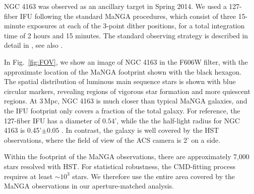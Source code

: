 \documentclass[preprint2]{aastex62}
\begin{document}
NGC 4163 was observed as an ancillary target in Spring 2014. We used a 127-fiber IFU following the standard MaNGA procedures, which consist of three 15-minute exposures at each of the 3-point dither positions, for a total integration time of 2 hours and 15 minutes. The standard observing strategy is described in detail in \citet{Yan+2016}, see also \citet{Law+2015}.

In Fig.~\ref{fig:FOV}, we show an image of NGC 4163 in the F606W filter, with the approximate location of the MaNGA footprint shown with the black hexagon. The spatial distribution of luminous main sequence stars is shown with blue circular markers, revealing regions of vigorous star formation and more quiescent regions. At 3\,Mpc, NGC 4163 is much closer than typical MaNGA galaxies, and the IFU footprint only covers a fraction of the total galaxy. For reference, the 127-fiber IFU has a diameter of $0.54$', while the the half-light radius for NGC 4163 is 0.45'$\pm0.05$ \citep{McConnachie+2012}. In contrast, the galaxy is well covered by the HST observations, where the field of view of the ACS camera is 2' on a side.

Within the footprint of the MaNGA observations, there are approximately 7,000 stars resolved with HST. For statistical robustness, the CMD-fitting process requires at least ${\sim}10^3$ stars. We therefore use the entire area covered by the MaNGA observations in our aperture-matched analysis. 
\end{document}
